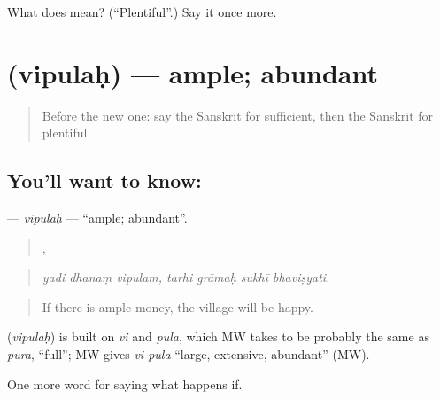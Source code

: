 \begin{tcolorbox}[breakable,colback=teal!4,colframe=teal!35!black,title={Before you move on}]
What does  mean? (\textquotedblleft{}Plentiful\textquotedblright{}.) Say it once more.
\end{tcolorbox}
\section[\texorpdfstring{\sk{विपुलः} (vipulaḥ)}{विपुलः (vipulaḥ)}]{ (vipulaḥ) — ample; abundant}

\label{lesson:SA-C379-vipulah}



\begin{quote}
Before the new one: say the Sanskrit for sufficient, then the Sanskrit for plentiful.
\end{quote}

\subsection*{You'll want to know: }
\textbf{} — \emph{vipulaḥ} — \textquotedblleft{}ample; abundant\textquotedblright{}.

\begin{quote}
  ,    
\end{quote}

\begin{quote}
\emph{yadi dhanaṃ vipulam, tarhi grāmaḥ sukhī bhaviṣyati.}
\end{quote}

\begin{quote}
If there is ample money, the village will be happy.
\end{quote}

\begin{cousinweb}
\textbf{} (\emph{vipulaḥ}) is built on \emph{vi} and \emph{pula}, which MW takes to be probably the same as \emph{pura}, \textquotedblleft{}full\textquotedblright{}; MW gives \emph{vi-pula} \textquotedblleft{}large, extensive, abundant\textquotedblright{} (MW).
\end{cousinweb}

\begin{grammarlens}[title={What you've built}]
One more word for saying what happens if.
\end{grammarlens}

